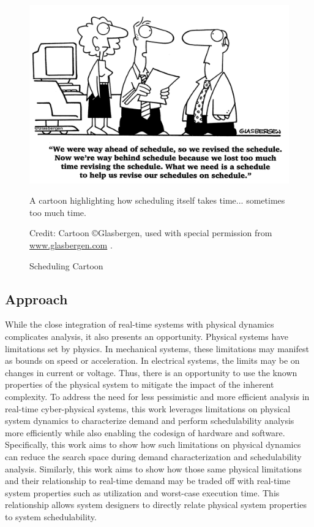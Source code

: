 \begin{figure}
    \centering
    \includegraphics[width=0.7\linewidth]{fig/515.jpg}
    \caption{Scheduling Cartoon} A cartoon highlighting how scheduling itself takes time... sometimes too much time.

    Credit: Cartoon \copyright Glasbergen, used with special permission from \url{www.glasbergen.com} \cite{glasbergen_todays_1998}.
\end{figure}

\subsection{Approach}
While the close integration of real-time systems with physical dynamics complicates analysis, it also presents an opportunity.
Physical systems have limitations set by physics.
In mechanical systems, these limitations may manifest as bounds on speed or acceleration.
In electrical systems, the limits may be on changes in current or voltage.
Thus, there is an opportunity to use the known properties of the physical system to mitigate the impact of the inherent complexity.
To address the need for less pessimistic and more efficient analysis in real-time cyber-physical systems, this work leverages limitations on physical system dynamics to characterize demand and perform schedulability analysis more efficiently while also enabling the codesign of hardware and software.
Specifically, this work aims to show how such limitations on physical dynamics can reduce the search space during demand characterization and schedulability analysis.
Similarly, this work aims to show how those same physical limitations and their relationship to real-time demand may be traded off with real-time system properties such as utilization and worst-case execution time.
This relationship allows system designers to directly relate physical system properties to system schedulability.

